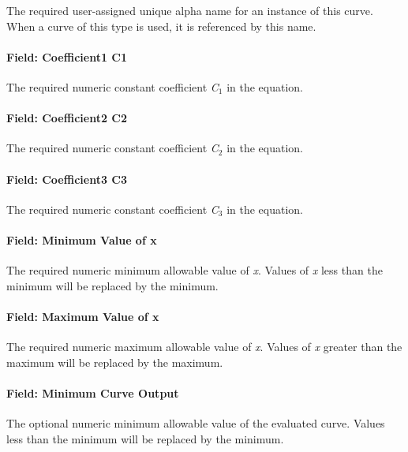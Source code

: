 The required user-assigned unique alpha name for an instance of this curve. When a curve of this type is used, it is referenced by this name.

\paragraph{Field: Coefficient1 C1}\label{field-coefficient1-c1-2}

The required numeric constant coefficient \emph{C\(_{1}\)} in the equation.

\paragraph{Field: Coefficient2 C2}\label{field-coefficient2-c2-2}

The required numeric constant coefficient \emph{C\(_{2}\)} in the equation.

\paragraph{Field: Coefficient3 C3}\label{field-coefficient3-c3-2}

The required numeric constant coefficient \emph{C\(_{3}\)} in the equation.

\paragraph{Field: Minimum Value of x}\label{field-minimum-value-of-x-14}

The required numeric minimum allowable value of \emph{x}. Values of \emph{x} less than the minimum will be replaced by the minimum.

\paragraph{Field: Maximum Value of x}\label{field-maximum-value-of-x-15}

The required numeric maximum allowable value of \emph{x}. Values of \emph{x} greater than the maximum will be replaced by the maximum.

\paragraph{Field: Minimum Curve Output}\label{field-minimum-curve-output-14}

The optional numeric minimum allowable value of the evaluated curve. Values less than the minimum will be replaced by the minimum.

